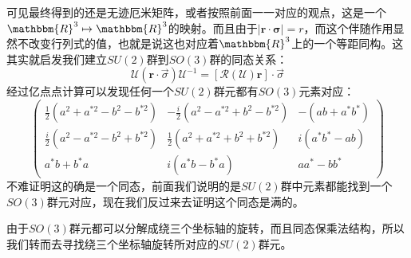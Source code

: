可见最终得到的还是无迹厄米矩阵，或者按照前面一一对应的观点，这是一个$\mathbbm{R}^3\mapsto\mathbbm{R}^3$的映射。而且由于$|\mathbf{r}\cdot\mathbf{\sigma}|=r$，而这个伴随作用显然不改变行列式的值，也就是说这也对应着$\mathbbm{R}^3$上的一个等距同构。这其实就启发我们建立$SU(2)$群到$SO(3)$群的同态关系：
\begin{equation}
	\mathcal{U}(\mathbf{r}\cdot\vec{\sigma})	\mathcal{U}^{-1}=\left[\mathscr{R}(\mathcal{U})\mathbf{r}\right]\cdot\vec{\sigma}
\end{equation}
经过亿点点计算可以发现任何一个$SU(2)$群元都有$SO(3)$元素对应：
\[\left( {\begin{array}{*{20}{c}}
		{\frac{1}{2}\left( {{a^2} + {a^{*2}} - {b^2} - {b^{*2}}} \right)}&{ - \frac{i}{2}\left( {{a^2} - {a^{*2}} + {b^2} - {b^{*2}}} \right)}&{ - \left( {ab + {a^*}{b^*}} \right)} \\ 
		{\frac{i}{2}\left( {{a^2} - {a^{*2}} - {b^2} + {b^{*2}}} \right)}&{\frac{1}{2}\left( {{a^2} + {a^{*2}} + {b^2} + {b^{*2}}} \right)}&{i\left( {{a^*}{b^*} - ab} \right)} \\ 
		{{a^*}b + {b^*}a}&{i\left( {{a^*}b - {b^*}a} \right)}&{a{a^*} - b{b^*}} 
\end{array}} \right)\]
不难证明这的确是一个同态，前面我们说明的是$SU(2)$群中元素都能找到一个$SO(3)$群元对应，现在我们反过来去证明这个同态是满的。

由于$SO(3)$群元都可以分解成绕三个坐标轴的旋转，而且同态保乘法结构，所以我们转而去寻找绕三个坐标轴旋转所对应的$SU(2)$群元。

